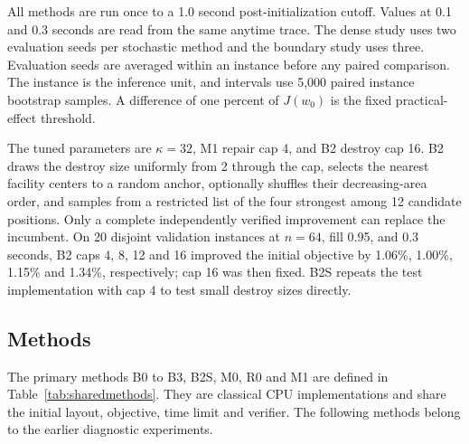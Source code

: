 \documentclass[preprint,12pt,authoryear]{elsarticle}
\begin{document}
All methods are run once to a 1.0 second post-initialization cutoff. Values at
0.1 and 0.3 seconds are read from the same anytime trace. The dense study uses
two evaluation seeds per stochastic method and the boundary study uses three.
Evaluation seeds are averaged within an instance before any paired comparison.
The instance is the inference unit, and intervals use 5,000 paired instance
bootstrap samples. A difference of one percent of $J(w_0)$ is the fixed
practical-effect threshold.

The tuned parameters are $\kappa=32$, M1 repair cap 4, and B2 destroy cap 16.
B2 draws the destroy size uniformly from 2 through the cap, selects the nearest
facility centers to a random anchor, optionally shuffles their decreasing-area
order, and samples from a restricted list of the four strongest among 12
candidate positions. Only a complete independently verified improvement can
replace the incumbent. On 20 disjoint validation instances at $n=64$, fill
0.95, and 0.3 seconds, B2 caps 4, 8, 12 and 16 improved the initial objective
by 1.06\%, 1.00\%, 1.15\% and 1.34\%, respectively; cap 16 was then fixed.
B2S repeats the test implementation with cap 4 to test small destroy sizes
directly.

\subsection{Methods}
The primary methods B0 to B3, B2S, M0, R0 and M1 are defined in
Table~\ref{tab:sharedmethods}. They are classical CPU implementations and share
the initial layout, objective, time limit and verifier. The following methods
belong to the earlier diagnostic experiments.
\end{document}
